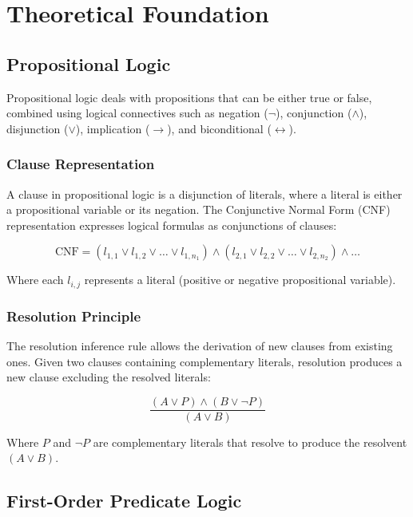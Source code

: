 \documentclass[11pt,a4paper]{article}
\begin{document}
\section{Theoretical Foundation}

\subsection{Propositional Logic}

Propositional logic deals with propositions that can be either true or false, combined using logical connectives such as negation ($\neg$), conjunction ($\wedge$), disjunction ($\vee$), implication ($\rightarrow$), and biconditional ($\leftrightarrow$).

\subsubsection{Clause Representation}

A clause in propositional logic is a disjunction of literals, where a literal is either a propositional variable or its negation. The Conjunctive Normal Form (CNF) representation expresses logical formulas as conjunctions of clauses:

\begin{equation}
\text{CNF} = (l_{1,1} \vee l_{1,2} \vee \ldots \vee l_{1,n_1}) \wedge (l_{2,1} \vee l_{2,2} \vee \ldots \vee l_{2,n_2}) \wedge \ldots
\end{equation}

Where each $l_{i,j}$ represents a literal (positive or negative propositional variable).

\subsubsection{Resolution Principle}

The resolution inference rule allows the derivation of new clauses from existing ones. Given two clauses containing complementary literals, resolution produces a new clause excluding the resolved literals:

\begin{equation}
\frac{(A \vee P) \wedge (B \vee \neg P)}{(A \vee B)}
\end{equation}

Where $P$ and $\neg P$ are complementary literals that resolve to produce the resolvent $(A \vee B)$.

\subsection{First-Order Predicate Logic}
\end{document}
